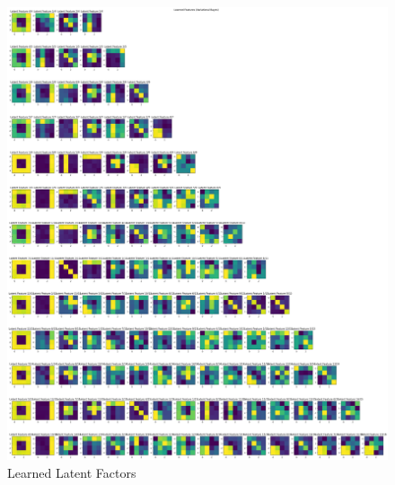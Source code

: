 \documentclass[12pt]{article}
\begin{document}
\newpage
\begin{figure}[h]
\centering
\begin{minipage}{.6\textwidth}
  \centering
\includegraphics[scale=0.15]{outputs/q4/b-latent-factors}
\caption{Learned Latent Factors}
\label{fig:}
\end{minipage}%
\begin{minipage}{.2\textwidth}
  \centering

\end{minipage}
\end{figure}
\end{document}
